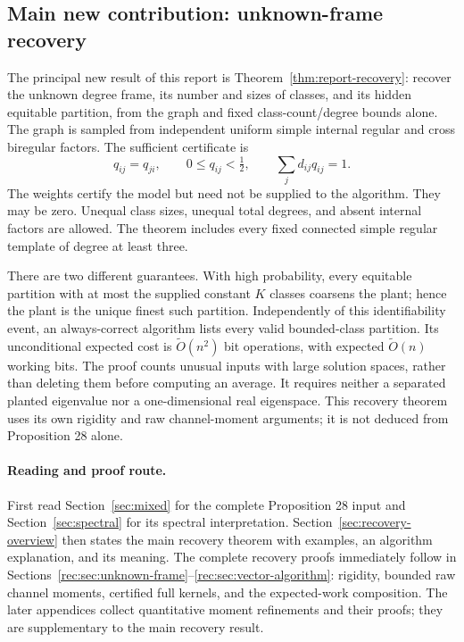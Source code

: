 \documentclass[11pt]{article}
\theoremstyle{definition}
\theoremstyle{remark}
\newcommand{\1}{\mathbf 1}
\begin{document}
\subsection{Main new contribution: unknown-frame recovery}
The principal new result of this report is
Theorem~\ref{thm:report-recovery}: recover the unknown degree frame,
its number and sizes of classes, and its hidden equitable partition,
from the graph and fixed class-count/degree bounds alone. The graph is
sampled from independent uniform simple internal regular and cross
biregular factors. The sufficient certificate is
\[
 q_{ij}=q_{ji},\qquad 0\le q_{ij}<\tfrac12,\qquad
                          \sum_jd_{ij}q_{ij}=1.
\]
The weights certify the model but need not be supplied to the algorithm.
They may be zero. Unequal class sizes, unequal total degrees, and absent
internal factors are allowed. The theorem includes every fixed connected
simple regular template of degree at least three.

There are two different guarantees. With high probability, every equitable
partition with at most the supplied constant $K$ classes coarsens the
plant; hence the plant is the unique finest such partition. Independently
of this identifiability event, an always-correct algorithm lists every
valid bounded-class partition. Its unconditional expected cost is
$\widetilde O(n^2)$ bit operations, with expected
$\widetilde O(n)$ working bits. The proof counts unusual inputs with large
solution spaces, rather than deleting them before computing an average.
It requires neither a separated planted eigenvalue nor a one-dimensional
real eigenspace. This recovery theorem uses its own rigidity and raw
channel-moment arguments; it is not deduced from Proposition 28 alone.

\paragraph{Reading and proof route.}
First read Section~\ref{sec:mixed} for the complete Proposition 28 input
and Section~\ref{sec:spectral} for its spectral interpretation.
Section~\ref{sec:recovery-overview} then states the main recovery theorem
with examples, an algorithm explanation, and its meaning.
The complete recovery proofs immediately follow in
Sections~\ref{rec:sec:unknown-frame}--\ref{rec:sec:vector-algorithm}:
rigidity, bounded raw channel moments, certified full kernels, and the
expected-work composition. The later appendices collect quantitative
moment refinements and their proofs; they are supplementary to the main
recovery result.
\end{document}
